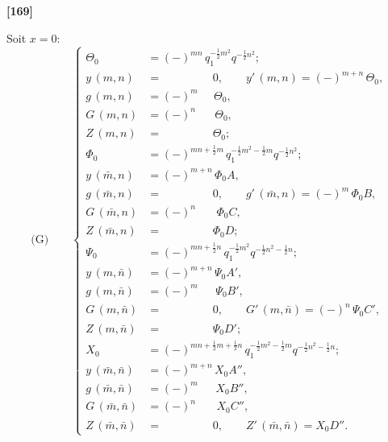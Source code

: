 \documentclass[11pt,a4paper]{book}
\begin{document}
\textbf{[169]}

Soit $x = 0$:
\begin{equation*}
\text{(G)}\qquad
\left\{
\begin{aligned}
\Theta_0 &= (-)^{mn}\, q_1^{-\frac{1}{2}m^2} q^{-\frac{1}{2}n^2};\\
y\, (m, n) &= \phantom{(-)^{m+n}} 0,\qquad y'\, (m, n) = (-)^{m+n}\, \Theta_0,\\
g\, (m, n) &= (-)^m \phantom{+n} \Theta_0,\\
G\, (m, n) &= (-)^n \phantom{+m} \Theta_0,\\
Z\, (m, n) &= \phantom{(-)^{m+n}} \Theta_0;\\
\Phi_0 &= (-)^{mn+\frac{1}{2}m}\, q_1^{-\frac{1}{2}m^2 - \frac{1}{2}m} q^{-\frac{1}{2}n^2};\\
y\, (\bar{m}, n) &= (-)^{m+n}\, \Phi_0 A,\\
g\, (\bar{m}, n) &= \phantom{(-)^{m+n}} 0,\qquad g'\, (\bar{m}, n) = (-)^m\, \Phi_0 B,\\
G\, (\bar{m}, n) &= (-)^n \phantom{+m}\, \Phi_0 C,\\
Z\, (\bar{m}, n) &= \phantom{(-)^{m+n}} \Phi_0 D;\\
\Psi_0 &= (-)^{mn+\frac{1}{2}n}\, q_1^{-\frac{1}{2}m^2} q^{-\frac{1}{2}n^2 - \frac{1}{2}n};\\
y\, (m, \bar{n}) &= (-)^{m+n}\, \Psi_0 A',\\
g\, (m, \bar{n}) &= (-)^m \phantom{+n}\, \Psi_0 B',\\
G\, (m, \bar{n}) &= \phantom{(-)^{m+n}} 0,\qquad G'\, (m, \bar{n}) = (-)^n\, \Psi_0 C',\\
Z\, (m, \bar{n}) &= \phantom{(-)^{m+n}} \Psi_0 D';\\
X_0 &= (-)^{mn+\frac{1}{2}m+\frac{1}{2}n}\, q_1^{-\frac{1}{2}m^2 - \frac{1}{2}m} q^{-\frac{1}{2}n^2 - \frac{1}{2}n};\\
y\, (\bar{m}, \bar{n}) &= (-)^{m+n}\, X_0 A'',\\
g\, (\bar{m}, \bar{n}) &= (-)^m \phantom{+n}\, X_0 B'',\\
G\, (\bar{m}, \bar{n}) &= (-)^n \phantom{+m}\, X_0 C'',\\
Z\, (\bar{m}, \bar{n}) &= \phantom{(-)^{m+n}} 0,\qquad Z'\, (\bar{m}, \bar{n}) = X_0 D''.
\end{aligned}
\right.
\end{equation*}
\end{document}
